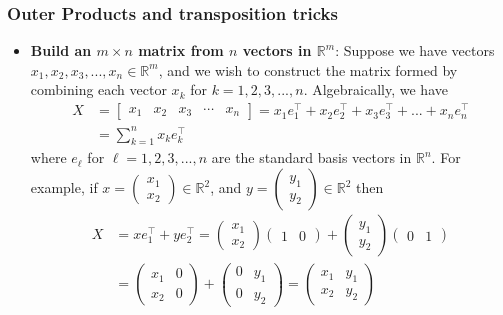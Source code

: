 \documentclass{report}
\begin{document}
    \pagebreak 
    \subsubsection{Outer Products and transposition tricks}
    \begin{itemize}
        \item \textbf{Build an $m\times n$ matrix from $n$ vectors in $\mathbb{R}^{m}$}: Suppose we have vectors $x_{1}, x_{2}, x_{3}, ..., x_{n} \in \mathbb{R}^{m}$, and we wish to construct the matrix formed by combining each vector $x_{k}$ for $k=1,2,3,...,n$. Algebraically, we have
            \begin{align*}
                X &= \begin{bmatrix} x_{1} & x_{2} & x_{3} & \cdots & x_{n} \end{bmatrix} = x_{1}e_{1}^{\top} + x_{2}e_{2}^{\top} + x_{3}e_{3}^{\top} + ... + x_{n}e_{n}^{\top} \\
                  &= \sum_{k=1}^{n}x_{k}e_{k}^{\top}
            \end{align*}
            where $e_{\ell}$ for $\ell = 1,2,3,...,n$ are the standard basis vectors in $\mathbb{R}^{n} $.
            \bigbreak \noindent 
            For example, if $x = \begin{pmatrix} x_{1} \\ x_{2} \end{pmatrix} \in \mathbb{R}^{2}$, and $y = \begin{pmatrix} y_{1} \\ y_{2} \end{pmatrix} \in \mathbb{R}^{2}$ then
            \begin{align*}
                X &= xe_{1}^{\top} + ye_{2}^{\top} = \begin{pmatrix} x_{1} \\ x_{2} \end{pmatrix} \begin{pmatrix} 1  & 0 \end{pmatrix} + \begin{pmatrix} y_{1} \\ y_{2} \end{pmatrix} \begin{pmatrix} 0 & 1 \end{pmatrix} \\
                  &= \begin{pmatrix} x_{1} & 0 \\ x_{2} & 0 \end{pmatrix} + \begin{pmatrix} 0& y_{1} \\ 0 & y_{2} \end{pmatrix} = \begin{pmatrix} x_{1} & y_{1} \\ x_{2} & y_{2} \end{pmatrix}

\end{align*}
\end{itemize}
\end{document}
